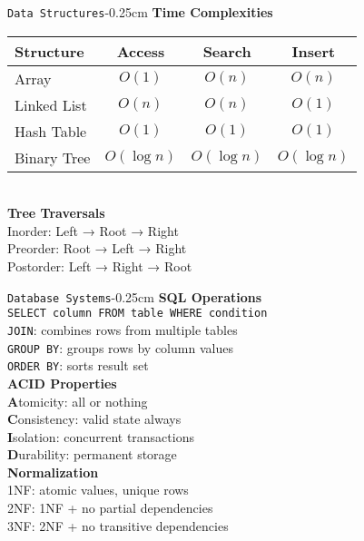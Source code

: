 \documentclass[10pt,3col]{cheatsheet}
\begin{document}
\begin{multicols}{3}
\begin{cheatsheetbox}{\texttt{Data Structures}}{-0.25cm}
    \textbf{Time Complexities}\\
    \begin{tabular}{|l|c|c|c|}
    \hline
    Structure & Access & Search & Insert \\
    \hline
    Array & $O(1)$ & $O(n)$ & $O(n)$ \\
    Linked List & $O(n)$ & $O(n)$ & $O(1)$ \\
    Hash Table & $O(1)$ & $O(1)$ & $O(1)$ \\
    Binary Tree & $O(\log n)$ & $O(\log n)$ & $O(\log n)$ \\
    \hline
    \end{tabular}\\
    \textbf{Tree Traversals}\\
    Inorder: Left → Root → Right\\
    Preorder: Root → Left → Right\\
    Postorder: Left → Right → Root
\end{cheatsheetbox}

\begin{cheatsheetbox}{\texttt{Database Systems}}{-0.25cm}
    \textbf{SQL Operations}\\
    \texttt{SELECT column FROM table WHERE condition}\\
    \texttt{JOIN}: combines rows from multiple tables\\
    \texttt{GROUP BY}: groups rows by column values\\
    \texttt{ORDER BY}: sorts result set\\
    \textbf{ACID Properties}\\
    \textbf{A}tomicity: all or nothing\\
    \textbf{C}onsistency: valid state always\\
    \textbf{I}solation: concurrent transactions\\
    \textbf{D}urability: permanent storage\\
    \textbf{Normalization}\\
    1NF: atomic values, unique rows\\
    2NF: 1NF + no partial dependencies\\
    3NF: 2NF + no transitive dependencies
\end{cheatsheetbox}


\end{multicols}
\end{document}
